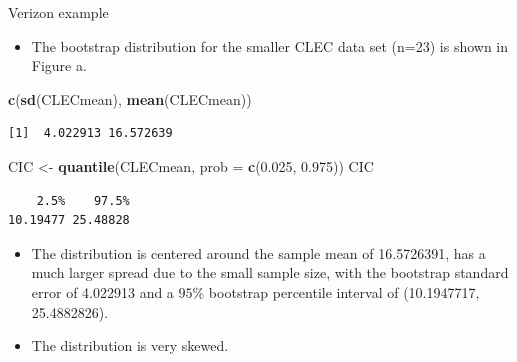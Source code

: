 \documentclass[
  ignorenonframetext,
]{beamer}
\newenvironment{Shaded}{\begin{snugshade}}{\end{snugshade}}
\newcommand{\AttributeTok}[1]{\textcolor[rgb]{0.13,0.29,0.53}{#1}}
\newcommand{\FloatTok}[1]{\textcolor[rgb]{0.00,0.00,0.81}{#1}}
\newcommand{\FunctionTok}[1]{\textcolor[rgb]{0.13,0.29,0.53}{\textbf{#1}}}
\newcommand{\NormalTok}[1]{#1}
\newcommand{\OtherTok}[1]{\textcolor[rgb]{0.56,0.35,0.01}{#1}}
\providecommand{\tightlist}{%
  \setlength{\itemsep}{0pt}\setlength{\parskip}{0pt}}
\begin{document}
\begin{frame}[fragile]{Verizon example}
\label{verizon-example-5}
\begin{itemize}
\tightlist
\item
  The bootstrap distribution for the smaller CLEC data set (n=23) is
  shown in Figure a.
\end{itemize}

\small

\begin{Shaded}
\begin{Highlighting}[]
\FunctionTok{c}\NormalTok{(}\FunctionTok{sd}\NormalTok{(CLECmean), }\FunctionTok{mean}\NormalTok{(CLECmean))}
\end{Highlighting}
\end{Shaded}

\begin{verbatim}
[1]  4.022913 16.572639
\end{verbatim}

\begin{Shaded}
\begin{Highlighting}[]
\NormalTok{CIC }\OtherTok{\textless{}{-}} \FunctionTok{quantile}\NormalTok{(CLECmean, }\AttributeTok{prob =} \FunctionTok{c}\NormalTok{(}\FloatTok{0.025}\NormalTok{, }\FloatTok{0.975}\NormalTok{))}
\NormalTok{CIC}
\end{Highlighting}
\end{Shaded}

\begin{verbatim}
    2.5%    97.5% 
10.19477 25.48828 
\end{verbatim}

\normalsize

\begin{itemize}
\tightlist
\item
  The distribution is centered around the sample mean of 16.5726391, has
  a much larger spread due to the small sample size, with the bootstrap
  standard error of 4.022913 and a \(95\%\) bootstrap percentile
  interval of (10.1947717, 25.4882826).
\item
  The distribution is very skewed.
\end{itemize}
\end{frame}
\end{document}
